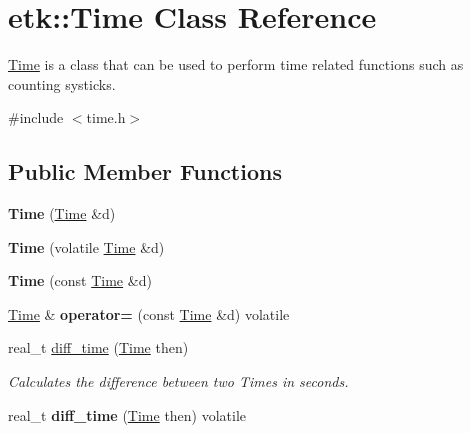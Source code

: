 \hypertarget{classetk_1_1_time}{\section{etk\-:\-:Time Class Reference}
\label{classetk_1_1_time}
}


\hyperlink{classetk_1_1_time}{Time} is a class that can be used to perform time related functions such as counting systicks.  




{\ttfamily \#include $<$time.\-h$>$}

\subsection*{Public Member Functions}
\begin{DoxyCompactItemize}
\item 
\hypertarget{classetk_1_1_time_a4a1745140f96049c2465678511889cf1}{{\bfseries Time} (\hyperlink{classetk_1_1_time}{Time} \&d)}\label{classetk_1_1_time_a4a1745140f96049c2465678511889cf1}

\item 
\hypertarget{classetk_1_1_time_acf7be97d9be2fa34c3d3a0615dbb0723}{{\bfseries Time} (volatile \hyperlink{classetk_1_1_time}{Time} \&d)}\label{classetk_1_1_time_acf7be97d9be2fa34c3d3a0615dbb0723}

\item 
\hypertarget{classetk_1_1_time_acb4ed167da8affc51be79856cee22c29}{{\bfseries Time} (const \hyperlink{classetk_1_1_time}{Time} \&d)}\label{classetk_1_1_time_acb4ed167da8affc51be79856cee22c29}

\item 
\hypertarget{classetk_1_1_time_ae78299592e099de6b3ea68399a88157b}{\hyperlink{classetk_1_1_time}{Time} \& {\bfseries operator=} (const \hyperlink{classetk_1_1_time}{Time} \&d) volatile}\label{classetk_1_1_time_ae78299592e099de6b3ea68399a88157b}

\item 
real\-\_\-t \hyperlink{classetk_1_1_time_a28a06c9d23c9a67d1a1bfcde18c4d026}{diff\-\_\-time} (\hyperlink{classetk_1_1_time}{Time} then)
\begin{DoxyCompactList}\small\item\em Calculates the difference between two Times in seconds. \end{DoxyCompactList}\item 
\hypertarget{classetk_1_1_time_a3afe52490cb579e0b1c7c6341dd4abab}{real\-\_\-t {\bfseries diff\-\_\-time} (\hyperlink{classetk_1_1_time}{Time} then) volatile}\label{classetk_1_1_time_a3afe52490cb579e0b1c7c6341dd4abab}


\end{DoxyCompactItemize}
